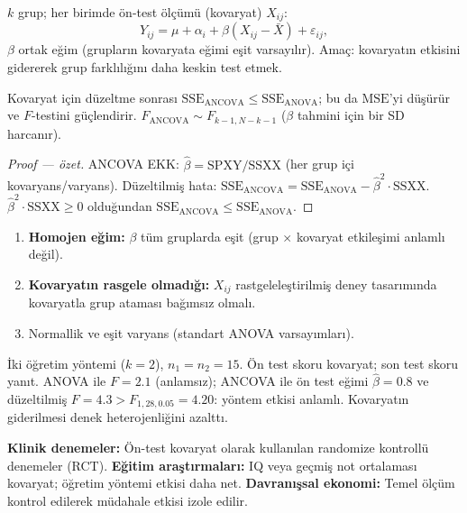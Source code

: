 \begin{tanim}\label{def:ancova}
$k$ grup; her birimde ön-test ölçümü (kovaryat) $X_{ij}$:
\[
  Y_{ij} = \mu + \alpha_i + \beta(X_{ij}-\bar X) + \varepsilon_{ij},
\]
$\beta$ ortak eğim (grupların kovaryata eğimi eşit varsayılır). Amaç: kovaryatın etkisini gidererek grup farklılığını daha keskin test etmek.
\end{tanim}

\begin{teorem}\label{thm:ancova_f}
Kovaryat için düzeltme sonrası $\mathrm{SSE}_{\mathrm{ANCOVA}}\leq\mathrm{SSE}_{\mathrm{ANOVA}}$; bu da $\mathrm{MSE}$'yi düşürür ve $F$-testini güçlendirir. $F_{\mathrm{ANCOVA}}\sim F_{k-1,N-k-1}$ ($\beta$ tahmini için bir SD harcanır).
\end{teorem}

\begin{proof}[Proof --- özet]
ANCOVA EKK: $\hat\beta=\mathrm{SPXY}/\mathrm{SSXX}$ (her grup içi kovaryans/varyans). Düzeltilmiş hata: $\mathrm{SSE}_{\mathrm{ANCOVA}}=\mathrm{SSE}_{\mathrm{ANOVA}}-\hat\beta^2\cdot\mathrm{SSXX}$. $\hat\beta^2\cdot\mathrm{SSXX}\geq0$ olduğundan $\mathrm{SSE}_{\mathrm{ANCOVA}}\leq\mathrm{SSE}_{\mathrm{ANOVA}}$.
\end{proof}

\begin{tanim}\label{def:ancova_varsayim}
\begin{enumerate}
  \item \textbf{Homojen eğim:} $\beta$ tüm gruplarda eşit (grup $\times$ kovaryat etkileşimi anlamlı değil).
  \item \textbf{Kovaryatın rasgele olmadığı:} $X_{ij}$ rastgeleleştirilmiş deney tasarımında kovaryatla grup ataması bağımsız olmalı.
  \item Normallik ve eşit varyans (standart ANOVA varsayımları).
\end{enumerate}
\end{tanim}

\begin{ornek}
İki öğretim yöntemi ($k=2$), $n_1=n_2=15$. Ön test skoru kovaryat; son test skoru yanıt. ANOVA ile $F=2.1$ (anlamsız); ANCOVA ile ön test eğimi $\hat\beta=0.8$ ve düzeltilmiş $F=4.3>F_{1,28,0.05}=4.20$: yöntem etkisi anlamlı. Kovaryatın giderilmesi denek heterojenliğini azalttı.
\end{ornek}

\begin{disiplinlerarasibaglan}
\textbf{Klinik denemeler:} Ön-test kovaryat olarak kullanılan randomize kontrollü denemeler (RCT). \textbf{Eğitim araştırmaları:} IQ veya geçmiş not ortalaması kovaryat; öğretim yöntemi etkisi daha net. \textbf{Davranışsal ekonomi:} Temel ölçüm kontrol edilerek müdahale etkisi izole edilir.
\end{disiplinlerarasibaglan}

